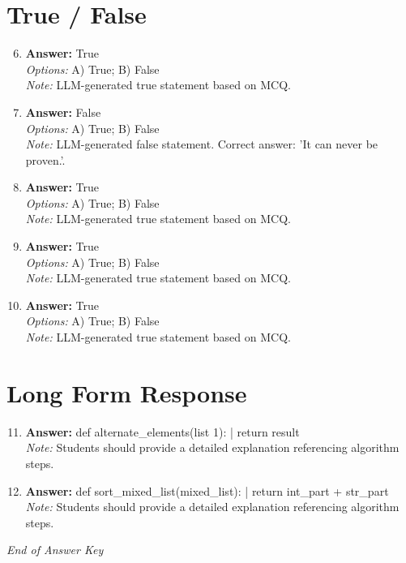 \documentclass[12pt]{article}
\begin{document}
\section*{True / False}
\begin{enumerate}[label=\arabic*.]
\setcounter{enumi}{5}
\item \textbf{Answer:} True
\\ \textit{Options:} A) True; B) False
\\ \textit{Note:} LLM-generated true statement based on MCQ.
\item \textbf{Answer:} False
\\ \textit{Options:} A) True; B) False
\\ \textit{Note:} LLM-generated false statement. Correct answer: 'It can never be proven.'.
\item \textbf{Answer:} True
\\ \textit{Options:} A) True; B) False
\\ \textit{Note:} LLM-generated true statement based on MCQ.
\item \textbf{Answer:} True
\\ \textit{Options:} A) True; B) False
\\ \textit{Note:} LLM-generated true statement based on MCQ.
\item \textbf{Answer:} True
\\ \textit{Options:} A) True; B) False
\\ \textit{Note:} LLM-generated true statement based on MCQ.
\end{enumerate}

\section*{Long Form Response}
\begin{enumerate}[label=\arabic*.]
\setcounter{enumi}{10}
\item \textbf{Answer:} def alternate\_elements(list 1): | return result
\\ \textit{Note:} Students should provide a detailed explanation referencing algorithm steps.
\item \textbf{Answer:} def sort\_mixed\_list(mixed\_list): | return int\_part + str\_part
\\ \textit{Note:} Students should provide a detailed explanation referencing algorithm steps.
\end{enumerate}

\vfill
\noindent\textit{End of Answer Key}
\end{document}
